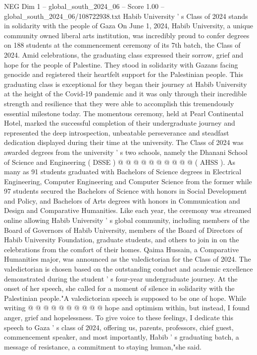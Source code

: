 \begin{textsample}{NEG Dim 1 – global\_south\_2024\_06 – Score 1.00 – global\_south\_2024\_06/108722938.txt}  \label{ex:f1_neg_399}
Habib University ' s Class of 2024 stands in solidarity with the people of Gaza On June 1, 2024, Habib University, a unique community owned liberal arts institution, was incredibly proud to confer degrees on 188 students at the commencement ceremony of its 7th batch, the Class of 2024.
Amid celebrations, the graduating class expressed their sorrow, grief and hope for the people of Palestine.
They stood in solidarity with Gazans facing genocide and registered their heartfelt support for the Palestinian people.
This graduating class is exceptional for they began their journey at Habib University at the height of the Covid-19 pandemic and it was only through their incredible strength and resilience that they were able to accomplish this tremendously essential milestone today.
The momentous ceremony, held at Pearl Continental Hotel, marked the successful completion of their undergraduate journey and represented the deep introspection, unbeatable perseverance and steadfast dedication displayed during their time at the university.
The Class of 2024 was awarded degrees from the university ' s two schools, namely the Dhanani School of Science and Engineering ( DSSE ) @ @ @ @ @ @ @ @ @ @ ( AHSS ).
As many as 91 students graduated with Bachelors of Science degrees in Electrical Engineering, Computer Engineering and Computer Science from the former while 97 students secured the Bachelors of Science with honors in Social Development and Policy, and Bachelors of Arts degrees with honors in Communication and Design and Comparative Humanities.
Like each year, the ceremony was streamed online allowing Habib University ' s global community, including members of the Board of Governors of Habib University, members of the Board of Directors of Habib University Foundation, graduate students, and others to join in on the celebrations from the comfort of their homes.
Qaima Hussain, a Comparative Humanities major, was announced as the valedictorian for the Class of 2024.
The valedictorian is chosen based on the outstanding conduct and academic excellence demonstrated during the student ' s four-year undergraduate journey.
At the onset of her speech, she called for a moment of silence in solidarity with the Palestinian people."A valedictorian speech is supposed to be one of hope.
While writing @ @ @ @ @ @ @ @ @ @ hope and optimism within, but instead, I found anger, grief and hopelessness.
To give voice to these feelings, I dedicate this speech to Gaza ' s class of 2024, offering us, parents, professors, chief guest, commencement speaker, and most importantly, Habib ' s graduating batch, a message of resistance, a commitment to staying human,"she said.

\end{textsample}
